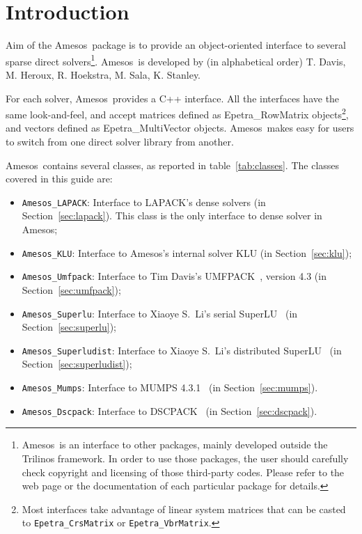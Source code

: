 \documentclass[11pt]{SANDreport}
\newcommand{\amesos}{{\sc Amesos}}
\begin{document}
\section{Introduction}
\label{sec:intro}

Aim of the \amesos\ package is to provide an object-oriented interface to
several sparse direct solvers\footnote{\amesos\ is an interface to other
  packages, mainly developed outside the Trilinos framework. In order to
  use those packages, the user should carefully check copyright and
  licensing of those third-party codes.  Please refer to the web page or
  the documentation of each particular package for details.}. 
\amesos\ is developed by (in alphabetical order) T. Davis, 
M. Heroux, R. Hoekstra, M. Sala, K. Stanley.

For each solver, \amesos\ provides a C++ interface. All the interfaces
have the same look-and-feel, and accept matrices defined as
Epetra\_RowMatrix objects\footnote{Most interfaces take advantage of
  linear system matrices that can be casted to {\tt Epetra\_CrsMatrix}
  or {\tt Epetra\_VbrMatrix}.}, and vectors defined as
Epetra\_MultiVector objects. \amesos\ makes easy for users to switch
from one direct solver library from another.

\amesos\ contains several classes, as reported in table~\ref{tab:classes}.
The classes covered in this guide are:
\begin{itemize}
\item \verb!Amesos_LAPACK!: Interface to LAPACK's dense solvers (in
  Section~\ref{sec:lapack}). This class is the only interface to
  dense solver in \amesos;
\item \verb!Amesos_KLU!: Interface to \amesos's internal solver KLU (in
  Section~\ref{sec:klu});
\item \verb!Amesos_Umfpack!: Interface to Tim Davis's
  UMFPACK~\cite{umfpack-home-page}, version 4.3 (in Section~\ref{sec:umfpack});
\item \verb!Amesos_Superlu!: Interface to Xiaoye S.~Li's serial
  SuperLU~\cite{superlu-home-page} (in Section~\ref{sec:superlu});
\item \verb!Amesos_Superludist!: Interface to Xiaoye S.~Li's distributed
  SuperLU~\cite{superlu-home-page} (in Section~\ref{sec:superludist});
\item \verb!Amesos_Mumps!: Interface to MUMPS
  4.3.1~\cite{mumps-home-page} (in Section~\ref{sec:mumps}).
\item \verb!Amesos_Dscpack!: Interface to DSCPACK~\cite{dscpack-manual} 
(in Section~\ref{sec:dscpack}).
\end{itemize}
\end{document}
